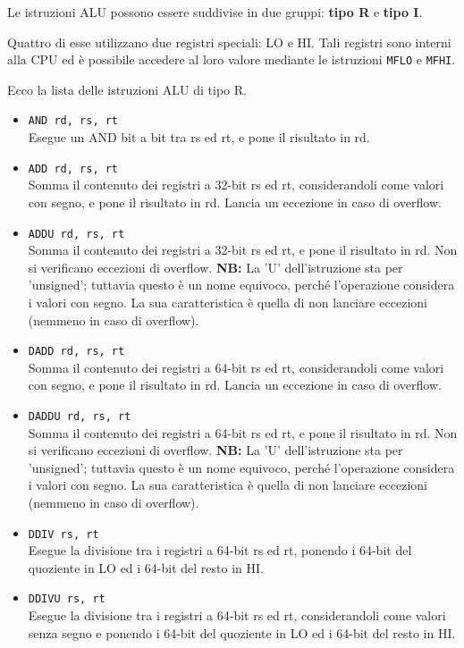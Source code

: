 \documentclass[12pt]{report}
\newcommand{\MISN}{\textbf{NB:} La 'U' dell'istruzione sta per 'unsigned'; tuttavia questo \`{e} 
un nome equivoco, perch\'{e} l'operazione considera i valori con segno. La sua caratteristica \`{e} 
quella di non lanciare eccezioni (nemmeno in caso di overflow).}
\begin{document}
Le istruzioni ALU possono essere suddivise in due gruppi: \textbf{tipo R} e \textbf{tipo I}. 

Quattro di esse utilizzano due registri speciali: LO e HI. Tali registri sono interni alla CPU ed \`{e} 
possibile accedere al loro valore mediante le istruzioni \texttt{MFLO} e \texttt{MFHI}.

Ecco la lista delle istruzioni ALU di tipo R.

\begin{itemize}
	\item \texttt{AND rd, rs, rt}\\
	Esegue un AND bit a bit tra rs ed rt, e pone il risultato in rd.
	
	\item \texttt{ADD rd, rs, rt}\\
	Somma il contenuto dei registri a 32-bit rs ed rt, considerandoli come valori con segno, e pone il risultato in rd.
	Lancia un eccezione in caso di overflow.

	\item \texttt{ADDU rd, rs, rt}\\
	Somma il contenuto dei registri a 32-bit rs ed rt, e pone il risultato in rd.
	Non si verificano eccezioni di overflow.
	\MISN{}

	\item \texttt{DADD rd, rs, rt}\\
	Somma il contenuto dei registri a 64-bit rs ed rt, considerandoli come valori con segno, e pone il risultato in rd.
	Lancia un eccezione in caso di overflow.

	\item \texttt{DADDU rd, rs, rt}\\
	Somma il contenuto dei registri a 64-bit rs ed rt, e pone il risultato in rd.
	Non si verificano eccezioni di overflow.
	\MISN{}

	\item \texttt{DDIV rs, rt}\\
	Esegue la divisione tra i registri a 64-bit rs ed rt, ponendo i 64-bit del quoziente
	in LO ed i 64-bit del resto in HI.

	\item \texttt{DDIVU rs, rt}\\
    	Esegue la divisione tra i registri a 64-bit rs ed rt, considerandoli come valori senza segno e
    	ponendo i 64-bit del quoziente in LO ed i 64-bit del resto in HI.


\end{itemize}
\end{document}
